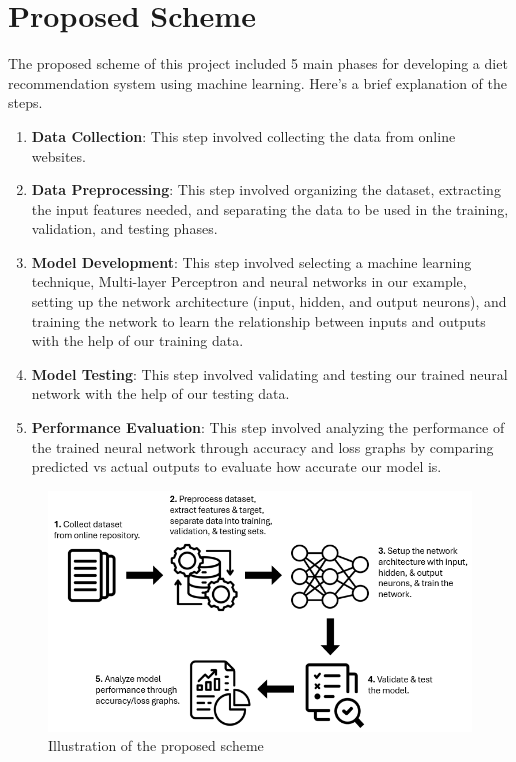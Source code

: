 \section{Proposed Scheme}
The proposed scheme of this project included 5 main phases for developing a diet recommendation system using machine learning. Here’s a brief explanation of the steps.

\begin{enumerate}
    \item \textbf{Data Collection}: This step involved collecting the data from online websites.
    \item \textbf{Data Preprocessing}: This step involved organizing the dataset, extracting the input features needed, and separating the data to be used in the training, validation, and testing phases.
    \item \textbf{Model Development}: This step involved selecting a machine learning technique, Multi-layer Perceptron and neural networks in our example, setting up the network architecture (input, hidden, and output neurons), and training the network to learn the relationship between inputs and outputs with the help of our training data.
    \item \textbf{Model Testing}: This step involved validating and testing our trained neural network with the help of our testing data.
    \item \textbf{Performance Evaluation}: This step involved analyzing the performance of the trained neural network through accuracy and loss graphs by comparing predicted vs actual outputs to evaluate how accurate our model is.
\end{enumerate}

\begin{figure}
    \centering
    \includegraphics[width=\linewidth]{Figures/proposed scheme 2.png}
    \caption{Illustration of the proposed scheme}
\end{figure}